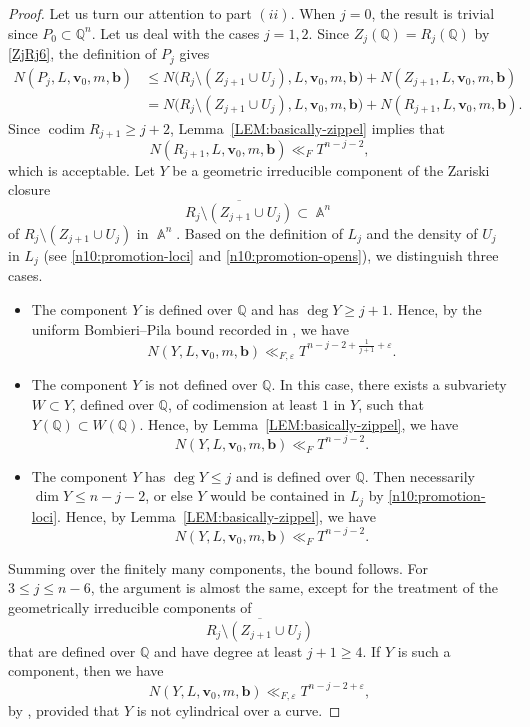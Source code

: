 \documentclass[a4paper,11pt, twoside,reqno]{amsart}
\theoremstyle{plain}
\theoremstyle{definition}
\theoremstyle{remark}
\newcommand{\bfb}{\bm{b}}
\newcommand{\bfv}{\bm{v}}
\newcommand{\QQ}{\mathbb{Q}}
\DeclareMathOperator{\codim}{codim}
\DeclareMathOperator{\A}{\mathbb{A}}
\renewcommand{\bar}{\overline}
\newcommand{\ve}{\varepsilon}
\renewcommand{\leq}{\leqslant}
\renewcommand{\geq}{\geqslant}
\numberwithin{equation}{section}
\begin{document}
\begin{proof}
Let us turn our attention to part $(ii)$.
When $j=0$, the
result is trivial since $P_0\subset\QQ^n$.
Let us deal with the cases $j=1,2$. Since
$Z_j(\QQ)=R_j(\QQ)$ by \eqref{ZjRj6}, the definition
of $P_j$ gives
\[
\begin{aligned}
N(P_j,L,\bfv_0,m,\bfb)
&\leq N\bigl(R_j\setminus(Z_{j+1}\cup U_j),L,\bfv_0,m,\bfb\bigr)
      +N(Z_{j+1},L,\bfv_0,m,\bfb)\\
&=N\bigl(R_j\setminus(Z_{j+1}\cup U_j),L,\bfv_0,m,\bfb\bigr)
      +N(R_{j+1},L,\bfv_0,m,\bfb).
\end{aligned}
\]
Since $\codim R_{j+1}\geq j+2$,
Lemma~\ref{LEM:basically-zippel}
implies that
\[
N(R_{j+1},L,\bfv_0,m,\bfb)\ll_F T^{n-j-2},
\]
which is acceptable. Let $Y$ be a geometric irreducible component
of the Zariski closure
\[
\bar{R_j\setminus(Z_{j+1}\cup U_j)}
\subset \A^n
\]
of $R_j\setminus(Z_{j+1}\cup U_j)$ in $\A^n$.
Based on the definition of $L_j$ and the density of $U_j$ in $L_j$
(see \eqref{n10:promotion-loci} and \eqref{n10:promotion-opens}),
we distinguish three cases.
\begin{itemize}
\item[$i)$]
The component $Y$ is defined over $\QQ$ and has
$\deg Y\geq j+1$. Hence, by the uniform
Bombieri--Pila bound recorded in \cite[Theorem~A]{Pila}, we have
\[
N(Y,L,\bfv_0,m,\bfb)
\ll_{F,\varepsilon}
T^{n-j-2+\frac{1}{j+1}+\ve}.
\]

\item[$ii)$]
The component $Y$ is not defined over $\QQ$. In this case,
there exists a subvariety $W\subset Y$, defined over
$\QQ$, of codimension at least $1$ in $Y$, such that
$Y(\QQ)\subset W(\QQ)$. Hence,
by Lemma~\ref{LEM:basically-zippel},
we have
\[
N(Y,L,\bfv_0,m,\bfb)
\ll_F T^{n-j-2}.
\]

\item[$iii)$]
The component $Y$ has $\deg Y\leq j$ and is defined over $\QQ$.
Then necessarily $\dim Y\leq n-j-2$,
or else $Y$ would be contained in $L_j$ by \eqref{n10:promotion-loci}.
Hence,
by Lemma~\ref{LEM:basically-zippel},
we have
\[
N(Y,L,\bfv_0,m,\bfb)
\ll_F T^{n-j-2}.
\]
\end{itemize}
Summing over the finitely many components, the bound follows.
For $3\leq j\leq n-6$, the argument is almost the same, except
for the treatment of the geometrically irreducible components
of
\[
\bar{R_j\setminus(Z_{j+1}\cup U_j)}
\]
that are defined over $\QQ$ and have degree at least
$j+1\geq4$. If $Y$ is such a component, then we have
\[
N(Y,L,\bfv_0,m,\bfb)
\ll_{F,\ve} T^{n-j-2+\ve},
\]
by \cite[Theorem~1.2]{Vermeulen}, provided that $Y$ is not
cylindrical over a curve.


\end{proof}
\end{document}
